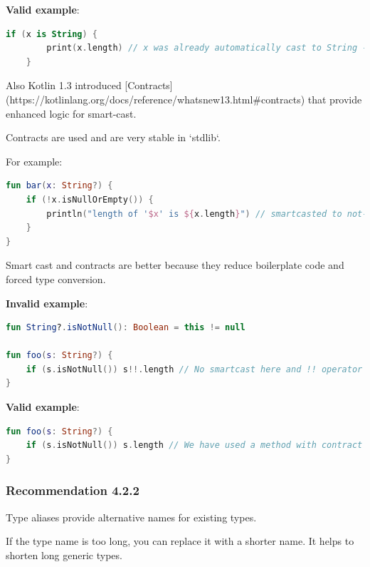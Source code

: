 {{{{\textbf{Valid example}:

\begin{lstlisting}[language=Kotlin]
    if (x is String) {
        print(x.length) // x was already automatically cast to String - no need to use 'as' keyword here
    }
\end{lstlisting}


Also Kotlin 1.3 introduced [Contracts](https://kotlinlang.org/docs/reference/whatsnew13.html\#contracts) that provide enhanced logic for smart-cast.

Contracts are used and are very stable in `stdlib`.



For example:



\begin{lstlisting}[language=Kotlin]
fun bar(x: String?) {
    if (!x.isNullOrEmpty()) {
        println("length of '$x' is ${x.length}") // smartcasted to not-null
    }
}
\end{lstlisting}


Smart cast and contracts are better because they reduce boilerplate code and forced type conversion.



\textbf{Invalid example}:

\begin{lstlisting}[language=Kotlin]
fun String?.isNotNull(): Boolean = this != null

fun foo(s: String?) {
    if (s.isNotNull()) s!!.length // No smartcast here and !! operator is used
}
\end{lstlisting}


\textbf{Valid example}:

\begin{lstlisting}[language=Kotlin]
fun foo(s: String?) {
    if (s.isNotNull()) s.length // We have used a method with contract from stdlib that helped compiler to execute smart cast
}
\end{lstlisting}


\subsubsection*{\textbf{Recommendation 4.2.2}}
\leavevmode\newline



Type aliases provide alternative names for existing types.

If the type name is too long, you can replace it with a shorter name. It helps to shorten long generic types.

}}}}
